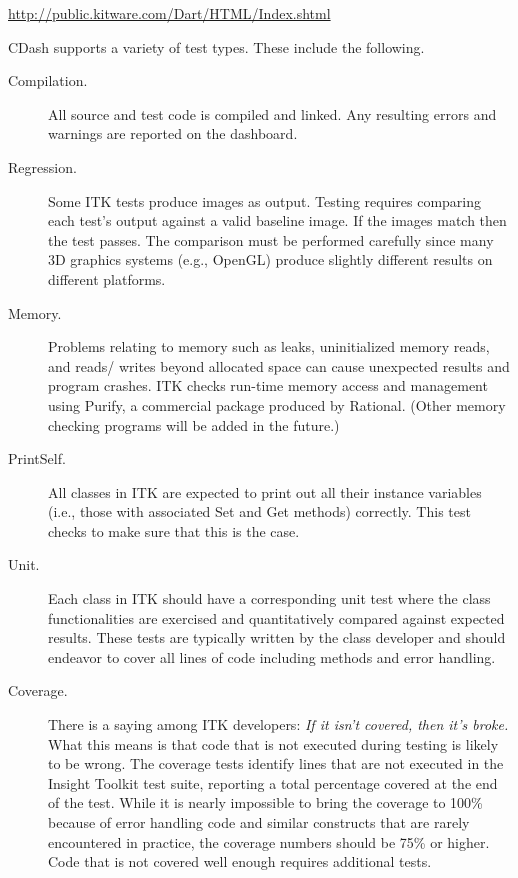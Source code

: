 \begin{center} 
\url{http://public.kitware.com/Dart/HTML/Index.shtml}
\end{center} 

CDash supports a variety of test types. These include the following.
\begin{description}
        \item[Compilation.] All source and test code is compiled and linked. 
        Any resulting errors and warnings are reported on the dashboard.

        \item[Regression.] Some ITK tests produce images as output. Testing
        requires comparing each test's output against a valid baseline image. If
        the images match then the test passes. The comparison must be
        performed carefully since many 3D graphics systems (e.g., OpenGL)
        produce slightly different results on different platforms.

        \item[Memory.] Problems relating to memory such as leaks, uninitialized
        memory reads, and reads/ writes beyond allocated space can cause 
        unexpected results and program crashes. ITK checks run-time memory 
        access and management using Purify, a commercial package produced by 
        Rational. (Other memory checking programs will be added in the future.)

        \item[PrintSelf.] All classes in ITK are expected to print out all
        their instance variables (i.e., those with associated Set and Get 
        methods) correctly. This test checks to make sure
        that this is the case.

        \item[Unit.] Each class in ITK should have a corresponding unit test
        where the class functionalities are exercised and quantitatively
        compared against expected results. These tests are typically written
        by the class developer and should endeavor to cover all lines of code
        including  methods and error handling.

       \item[Coverage.] There is a saying among ITK developers: \emph{If it
        isn't covered, then it's broke.} What this means is that
        code that is not executed during testing is likely to be wrong. The
        coverage tests identify lines that are not executed in the
        Insight Toolkit test suite, reporting a total percentage
        covered at the end of the test. While it is nearly impossible to
        bring the coverage to 100\% because of error handling code and similar
        constructs that are rarely encountered in practice, the coverage
        numbers should be 75\% or higher. Code that is not covered well enough
        requires additional tests.
\end{description}

